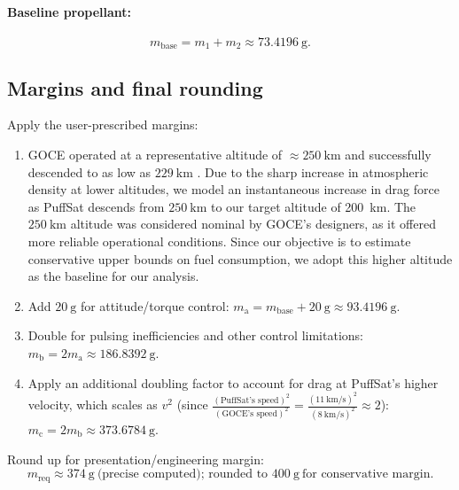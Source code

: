 \documentclass{article}
\begin{document}
\paragraph{Baseline propellant:}
\[
m_{\mathrm{base}} = m_1 + m_2 \approx \SI{73.4196}{\g}.
\]

\subsection*{Margins and final rounding}
Apply the user-prescribed margins:
\begin{enumerate}
  \item GOCE operated at a representative altitude of $\approx \SI{250}{\kilo\meter}$ and successfully descended to as low as $\SI{229}{\kilo\meter}$ \cite{goce_229km}. Due to the sharp increase in atmospheric density at lower altitudes, we model an instantaneous increase in drag force as PuffSat descends from $\SI{250}{\kilo\meter}$ to our target altitude of \SI{200}{\kilo\meter}. The $\SI{250}{\kilo\meter}$ altitude was considered nominal by GOCE’s designers, as it offered more reliable operational conditions. Since our objective is to estimate conservative upper bounds on fuel consumption, we adopt this higher altitude as the baseline for our analysis.
  \item Add \(\SI{20}{\g}\) for attitude/torque control: \(m_{\mathrm{a}} = m_{\mathrm{base}} + \SI{20}{\g} \approx \SI{93.4196}{\g}.\)
  \item Double for pulsing inefficiencies and other control limitations: \(m_{\mathrm{b}} = 2 m_{\mathrm{a}} \approx \SI{186.8392}{\g}.\)
  \item Apply an additional doubling factor to account for drag at PuffSat’s higher velocity, which scales as \(v^2\) (since $\frac{(\text{PuffSat's speed})^2}{(\text{GOCE's speed})^2} = \frac{\left(\SI{11}{\kilo\meter\per\second}\right)^2}{\left(\SI{8}{\kilo\meter\per\second}\right)^2}
 \approx 2$): \(m_{\mathrm{c}} = 2 m_{\mathrm{b}} \approx \SI{373.6784}{\g}.\)

\end{enumerate}

Round up for presentation/engineering margin:
\[
\boxed{m_{\mathrm{req}} \approx \SI{374}{\g}\ \text{(precise computed); rounded to }\SI{400}{\g}\ \text{for conservative margin}.}
\]
\end{document}
